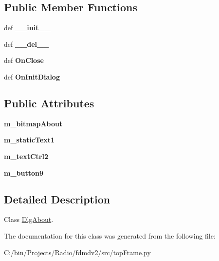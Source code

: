 \subsection*{Public Member Functions}
\begin{DoxyCompactItemize}
\item 
\hypertarget{classtop_frame_1_1_dlg_about_a9a54951456720a52289b2cf0cb554f8f}{def {\bfseries \-\_\-\-\_\-init\-\_\-\-\_\-}}\label{classtop_frame_1_1_dlg_about_a9a54951456720a52289b2cf0cb554f8f}

\item 
\hypertarget{classtop_frame_1_1_dlg_about_a2ae66cf7ba45375df2430997bf343d83}{def {\bfseries \-\_\-\-\_\-del\-\_\-\-\_\-}}\label{classtop_frame_1_1_dlg_about_a2ae66cf7ba45375df2430997bf343d83}

\item 
\hypertarget{classtop_frame_1_1_dlg_about_a857097225e2f16ad6f280eb801e85a9a}{def {\bfseries On\-Close}}\label{classtop_frame_1_1_dlg_about_a857097225e2f16ad6f280eb801e85a9a}

\item 
\hypertarget{classtop_frame_1_1_dlg_about_aa081cc24b3c0e89f3e89b3d9db5607b4}{def {\bfseries On\-Init\-Dialog}}\label{classtop_frame_1_1_dlg_about_aa081cc24b3c0e89f3e89b3d9db5607b4}

\end{DoxyCompactItemize}
\subsection*{Public Attributes}
\begin{DoxyCompactItemize}
\item 
\hypertarget{classtop_frame_1_1_dlg_about_a0a7d799c2f12548b0361431beee39ee3}{{\bfseries m\-\_\-bitmap\-About}}\label{classtop_frame_1_1_dlg_about_a0a7d799c2f12548b0361431beee39ee3}

\item 
\hypertarget{classtop_frame_1_1_dlg_about_ad598c9e5cd10837598c4cb05b666e901}{{\bfseries m\-\_\-static\-Text1}}\label{classtop_frame_1_1_dlg_about_ad598c9e5cd10837598c4cb05b666e901}

\item 
\hypertarget{classtop_frame_1_1_dlg_about_a92b3f82522d65be92730ea21323e05a1}{{\bfseries m\-\_\-text\-Ctrl2}}\label{classtop_frame_1_1_dlg_about_a92b3f82522d65be92730ea21323e05a1}

\item 
\hypertarget{classtop_frame_1_1_dlg_about_a84e41c9f9794cdc92cbb4c57ef0101b9}{{\bfseries m\-\_\-button9}}\label{classtop_frame_1_1_dlg_about_a84e41c9f9794cdc92cbb4c57ef0101b9}

\end{DoxyCompactItemize}


\subsection{Detailed Description}
Class \hyperlink{classtop_frame_1_1_dlg_about}{Dlg\-About}. 

The documentation for this class was generated from the following file\-:\begin{DoxyCompactItemize}
\item 
C\-:/bin/\-Projects/\-Radio/fdmdv2/src/top\-Frame.\-py\end{DoxyCompactItemize}
